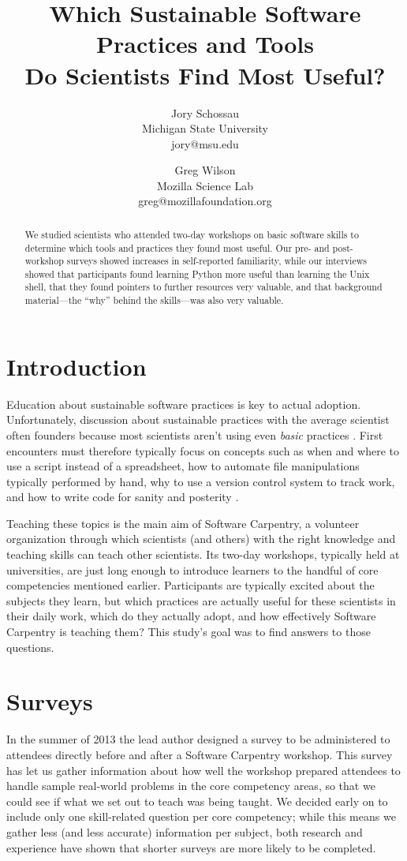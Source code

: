 \documentclass[10pt, twocolumn]{article}
\title{Which Sustainable Software Practices and Tools\\ Do Scientists Find Most Useful?}
\author{
    Jory Schossau \\
    \small{Michigan State University} \\
    \small{jory@msu.edu}
    \and
    Greg Wilson \\
    \small{Mozilla Science Lab} \\
    \small{greg@mozillafoundation.org}
}
\begin{document}
\maketitle

\begin{abstract}
We studied scientists who attended two-day workshops on basic software skills
to determine which tools and practices they found most useful.
Our pre- and post-workshop surveys showed increases in self-reported familiarity,
while our interviews showed that participants found learning Python more useful than learning the Unix shell,
that they found pointers to further resources very valuable,
and that background material---the ``why'' behind the skills---was also very valuable.
\end{abstract}

\section{Introduction}

Education about sustainable software practices
is key to actual adoption.
Unfortunately,
discussion about sustainable practices with the average scientist often founders
because most scientists aren't using even \emph{basic} practices \cite{b:hannay2009,b:prabhu2011}.
First encounters must therefore typically focus on concepts such as
when and where to use a script instead of a spreadsheet,
how to automate file manipulations typically performed by hand,
why to use a version control system to track work,
and how to write code for sanity and posterity \cite{b:wilson2013}.

Teaching these topics is the main aim of Software Carpentry,
a volunteer organization through which scientists (and others)
with the right knowledge and teaching skills can teach other scientists.
Its two-day workshops,
typically held at universities,
are just long enough to introduce learners to the handful of core competencies mentioned earlier.
Participants are typically excited about the subjects they learn,
but which practices are actually useful for these scientists in their daily work,
which do they actually adopt,
and how effectively Software Carpentry is teaching them?
This study's goal was to find answers to those questions.

\section{Surveys}

In the summer of 2013
the lead author designed a survey
to be administered to attendees directly before and after a Software Carpentry workshop.
This survey has let us gather information about
how well the workshop prepared attendees to handle sample real-world problems in the core competency areas,
so that we could see if what we set out to teach was being taught.
We decided early on to include only one skill-related question per core competency;
while this means we gather less (and less accurate) information per subject,
both research and experience have shown that shorter surveys are more likely to be completed.
\end{document}
